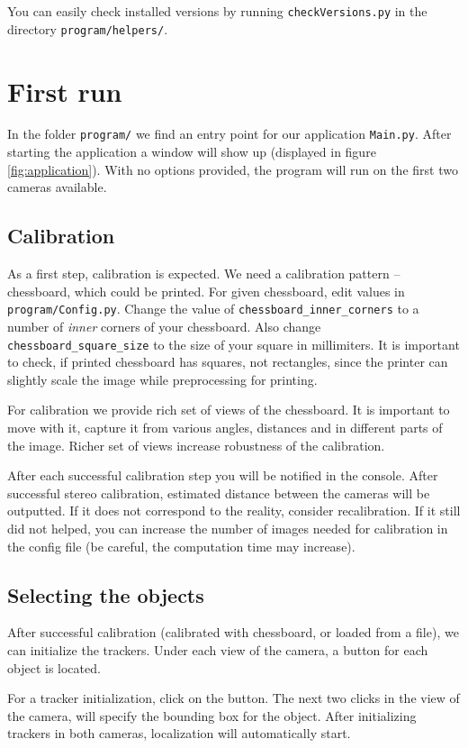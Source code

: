 You can easily check installed versions by running \verb+checkVersions.py+ in
the directory \verb+program/helpers/+.

\section{First run}

In the folder \verb+program/+ we find an entry point for our application
\verb+Main.py+. After starting the application a window will show up (displayed
in figure \ref{fig:application}). With no options provided, the program will
run on the first two cameras available.

\subsection{Calibration}
As a first step, calibration is expected. We need a calibration pattern --
chessboard, which could be printed. For given chessboard, edit values in
\verb+program/Config.py+. Change the value of \verb+chessboard_inner_corners+
to a number of \emph{inner} corners of your chessboard. Also change
\verb+chessboard_square_size+ to the size of your square in millimiters. It is
important to check, if printed chessboard has squares, not rectangles, since
the printer can slightly scale the image while preprocessing for printing.

For calibration we provide rich set of views of the chessboard. It is important
to move with it, capture it from various angles, distances and in different
parts of the image. Richer set of views increase robustness of the calibration.

After each successful calibration step you will be notified in the console.
After successful stereo calibration, estimated distance between the cameras
will be outputted. If it does not correspond to the reality, consider
recalibration. If it still did not helped, you can increase the number of
images needed for calibration in the config file (be careful, the computation
time may increase).

\subsection{Selecting the objects}
After successful calibration (calibrated with chessboard, or loaded from a
file), we can initialize the trackers. Under each view of the camera, a button
for each object is located.

For a tracker initialization, click on the button. The next two clicks in the
view of the camera, will specify the bounding box for the object. After
initializing trackers in both cameras, localization will automatically start.

